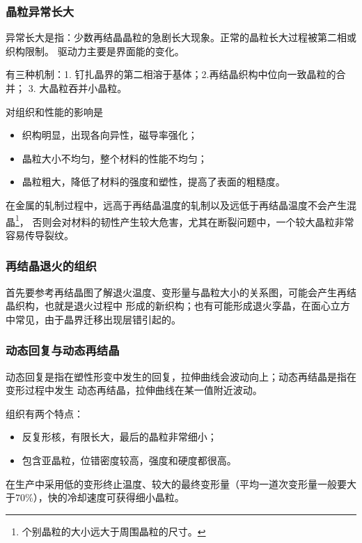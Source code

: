             \subsubsection{晶粒异常长大}
                异常长大是指：少数再结晶晶粒的急剧长大现象。正常的晶粒长大过程被第二相或织构限制。
                驱动力主要是界面能的变化。

                有三种机制：1. 钉扎晶界的第二相溶于基体；2.再结晶织构中位向一致晶粒的合并；
                3. 大晶粒吞并小晶粒。

                对组织和性能的影响是
                \begin{itemize}
                    \item[1] 织构明显，出现各向异性，磁导率强化；
                    \item[2] 晶粒大小不均匀，整个材料的性能不均匀；
                    \item[3] 晶粒粗大，降低了材料的强度和塑性，提高了表面的粗糙度。 
                \end{itemize}

                在金属的轧制过程中，远高于再结晶温度的轧制以及远低于再结晶温度不会产生混晶\footnote{个别晶粒的大小远大于周围晶粒的尺寸。}，
                否则会对材料的韧性产生较大危害，尤其在断裂问题中，一个较大晶粒非常容易传导裂纹。

            \subsubsection{再结晶退火的组织}
                首先要参考再结晶图了解退火温度、变形量与晶粒大小的关系图，可能会产生再结晶织构，也就是退火过程中
                形成的新织构；也有可能形成退火孪晶，在面心立方中常见，由于晶界迁移出现层错引起的。

            \subsubsection{动态回复与动态再结晶}
                动态回复是指在塑性形变中发生的回复，拉伸曲线会波动向上；动态再结晶是指在变形过程中发生
                动态再结晶，拉伸曲线在某一值附近波动。

                组织有两个特点：
                \begin{itemize}
                    \item 反复形核，有限长大，最后的晶粒非常细小；
                    \item 包含亚晶粒，位错密度较高，强度和硬度都很高。 
                \end{itemize}

                在生产中采用低的变形终止温度、较大的最终变形量（平均一道次变形量一般要大于70\%），快的冷却速度可获得细小晶粒。